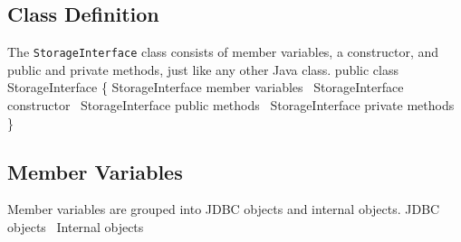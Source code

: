 \documentclass{article}
\def\nwendcode{\endtrivlist \endgroup}
\let\nwdocspar=\par
\theoremstyle{definition}
\begin{document}
\subsection{Class Definition}
\label{sec:class-definition}
The {\tt{}StorageInterface} class consists of member variables, a constructor, and public
and private methods, just like any other Java class.
\nwenddocs{}\endmoddef{}
public class StorageInterface \{
  \LA{}\code{}StorageInterface\edoc{} member variables~{\nwtagstyle{}}\RA{}
  \LA{}\code{}StorageInterface\edoc{} constructor~{\nwtagstyle{}}\RA{}
  \LA{}\code{}StorageInterface\edoc{} public methods~{\nwtagstyle{}}\RA{}
  \LA{}\code{}StorageInterface\edoc{} private methods~{\nwtagstyle{}}\RA{}
\}
\nwendcode{}\nwdocspar

\subsection{Member Variables}
\label{sec:member-variables}
Member variables are grouped into JDBC objects and internal objects.
\nwenddocs{}\endmoddef{}
\LA{}JDBC objects~{\nwtagstyle{}}\RA{}
\LA{}Internal objects~{\nwtagstyle{}}\RA{}
\nwendcode{}\nwdocspar
\end{document}
